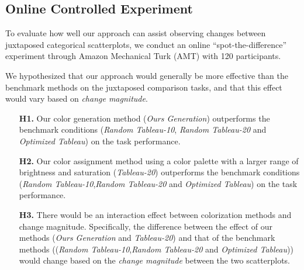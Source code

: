 \subsection{Online Controlled Experiment}
\label{subsec:onlinestudy}

To evaluate how well our approach can assist observing changes between juxtaposed categorical scatterplots, we conduct an online ``spot-the-difference'' experiment through Amazon Mechanical Turk (AMT) with 120 participants.

\vspace{.3em}
 We hypothesized that our approach would generally be more effective than the benchmark methods on the juxtaposed comparison tasks, and that this effect would vary based on \emph{change magnitude}.
\begin{itemize}[noitemsep]
\setlength{\itemsep}{5pt}
    \item[\textbf{H1.}] Our color generation method (\emph{Ours Generation}) outperforms the benchmark conditions (\emph{Random Tableau-10}, \emph{Random Tableau-20} and \emph{Optimized Tableau}) on the task performance.

    \item [\textbf{H2.}] Our color assignment method using a color palette with a larger range of brightness and saturation (\emph{Tableau-20}) outperforms the benchmark conditions (\emph{Random Tableau-10},\emph{Random Tableau-20} and \emph{Optimized Tableau}) on the task performance.

    \item [\textbf{H3.}] There would be an interaction effect between colorization methods and change magnitude. Specifically, the difference between the effect of our methods (\emph{Ours Generation} and \emph{Tableau-20}) and that of the benchmark methods ((\emph{Random Tableau-10},\emph{Random Tableau-20} and \emph{Optimized Tableau})) would change based on the \emph{change magnitude} between the two scatterplots.
\end{itemize}

